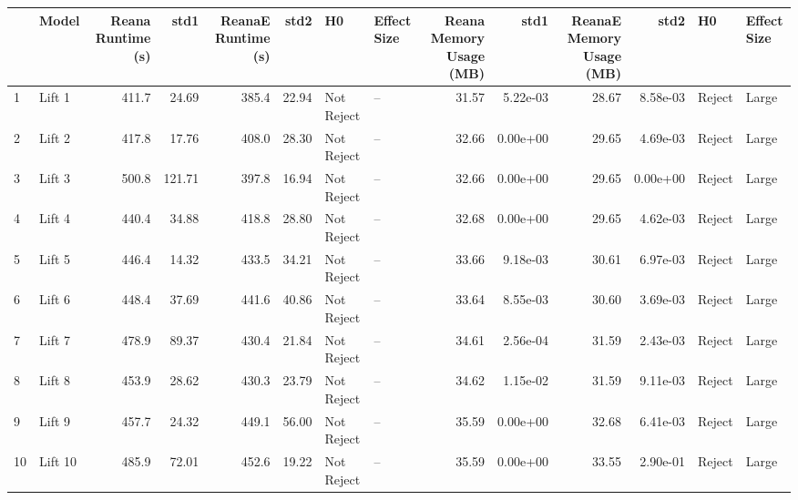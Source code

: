 \begin{tabular}{llrrrrllrrrrll}
\toprule
{} &    Model &  Reana Runtime (s) &    std1 &  ReanaE Runtime (s) &   std2 &          H0 & Effect Size &  Reana Memory Usage (MB) &      std1 &  ReanaE Memory Usage (MB) &      std2 &      H0 & Effect Size \\
\midrule
1  &   Lift 1 &              411.7 &   24.69 &               385.4 &  22.94 &  Not Reject &          -- &                    31.57 &  5.22e-03 &                     28.67 &  8.58e-03 &  Reject &       Large \\
2  &   Lift 2 &              417.8 &   17.76 &               408.0 &  28.30 &  Not Reject &          -- &                    32.66 &  0.00e+00 &                     29.65 &  4.69e-03 &  Reject &       Large \\
3  &   Lift 3 &              500.8 &  121.71 &               397.8 &  16.94 &  Not Reject &          -- &                    32.66 &  0.00e+00 &                     29.65 &  0.00e+00 &  Reject &       Large \\
4  &   Lift 4 &              440.4 &   34.88 &               418.8 &  28.80 &  Not Reject &          -- &                    32.68 &  0.00e+00 &                     29.65 &  4.62e-03 &  Reject &       Large \\
5  &   Lift 5 &              446.4 &   14.32 &               433.5 &  34.21 &  Not Reject &          -- &                    33.66 &  9.18e-03 &                     30.61 &  6.97e-03 &  Reject &       Large \\
6  &   Lift 6 &              448.4 &   37.69 &               441.6 &  40.86 &  Not Reject &          -- &                    33.64 &  8.55e-03 &                     30.60 &  3.69e-03 &  Reject &       Large \\
7  &   Lift 7 &              478.9 &   89.37 &               430.4 &  21.84 &  Not Reject &          -- &                    34.61 &  2.56e-04 &                     31.59 &  2.43e-03 &  Reject &       Large \\
8  &   Lift 8 &              453.9 &   28.62 &               430.3 &  23.79 &  Not Reject &          -- &                    34.62 &  1.15e-02 &                     31.59 &  9.11e-03 &  Reject &       Large \\
9  &   Lift 9 &              457.7 &   24.32 &               449.1 &  56.00 &  Not Reject &          -- &                    35.59 &  0.00e+00 &                     32.68 &  6.41e-03 &  Reject &       Large \\
10 &  Lift 10 &              485.9 &   72.01 &               452.6 &  19.22 &  Not Reject &          -- &                    35.59 &  0.00e+00 &                     33.55 &  2.90e-01 &  Reject &       Large \\

\end{tabular}
